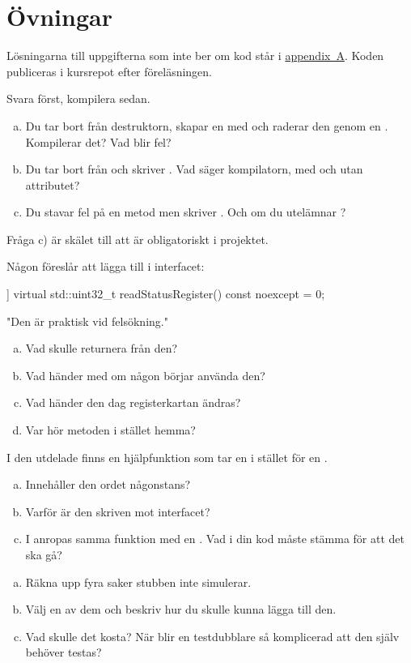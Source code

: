 \section*{Övningar}

Lösningarna till uppgifterna som inte ber om kod står i \hyperref[ch:losningar]{appendix~A}.
Koden publiceras i kursrepot efter föreläsningen.

\label{ex:6:1}
Svara först, kompilera sedan.
\begin{enumerate}[a)]
  \item Du tar bort  från destruktorn, skapar en  med  och
    raderar den genom en . Kompilerar det? Vad blir fel?
  \item Du tar bort \code{[[nodiscard]]} från  och skriver
    . Vad säger kompilatorn, med och utan attributet?
  \item Du stavar fel på en metod men skriver . Och om du utelämnar
    ?
\end{enumerate}
Fråga c) är skälet till att  är obligatoriskt i projektet.

\label{ex:6:2}
Någon föreslår att lägga till i interfacet:
\begin{cppcode}
[[nodiscard]] virtual std::uint32_t readStatusRegister() const noexcept = 0;
\end{cppcode}
"Den är praktisk vid felsökning."
\begin{enumerate}[a)]
  \item Vad skulle  returnera från den?
  \item Vad händer med  om någon börjar använda den?
  \item Vad händer den dag registerkartan ändras?
  \item Var hör metoden i stället hemma?
\end{enumerate}

\label{ex:6:3}
I den utdelade  finns en hjälpfunktion som tar en
 i stället för en .
\begin{enumerate}[a)]
  \item Innehåller den ordet  någonstans?
  \item Varför är den skriven mot interfacet?
  \item I  anropas samma funktion med en . Vad i din kod måste
    stämma för att det ska gå?
\end{enumerate}

\label{ex:6:4}
\begin{enumerate}[a)]
  \item Räkna upp fyra saker stubben inte simulerar.
  \item Välj en av dem och beskriv hur du skulle kunna lägga till den.
  \item Vad skulle det kosta? När blir en testdubblare så komplicerad att den själv behöver
    testas?
\end{enumerate}
